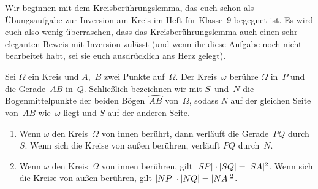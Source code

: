 Wir beginnen mit dem Kreisberührungslemma, das euch schon als Übungsaufgabe zur Inversion am Kreis im Heft für Klasse~9 begegnet ist. Es wird euch also wenig überraschen, dass das Kreisberührungslemma auch einen sehr eleganten Beweis mit Inversion zulässt (und wenn ihr diese Aufgabe noch nicht bearbeitet habt, sei sie euch ausdrücklich ans Herz gelegt).

\begin{satzmitnamen}[Kreisberührungslemma]
	Sei $\Omega$ ein Kreis und $A$,~$B$ zwei Punkte auf~$\Omega$. Der Kreis~$\omega$ berühre $\Omega$ in~$P$ und die Gerade~$AB$ in~$Q$. Schließlich bezeichnen wir mit $S$~und~$N$ die Bogenmittelpunkte der beiden Bögen~$\wideparen{AB}$ von~$\Omega$, sodass $N$ auf der gleichen Seite von~$AB$ wie~$\omega$ liegt und $S$ auf der anderen Seite.
	\begin{enumerate}
		\item \label{itm:Kreisberuhrung}
		Wenn $\omega$ den Kreis~$\Omega$ von innen berührt, dann verläuft die Gerade~$PQ$ durch~$S$. Wenn sich die Kreise von außen berühren, verläuft $PQ$ durch~$N$.
		\item \label{itm:KreisberuhrungProdukt}
		Wenn $\omega$ den Kreis~$\Omega$ von innen berühren, gilt $\lvert SP\rvert\cdot \lvert SQ\rvert=\lvert SA\rvert^2$. Wenn sich die Kreise von außen berühren, gilt $\lvert NP\rvert\cdot \lvert NQ\rvert=\lvert NA\rvert^2$.
	\end{enumerate}
\end{satzmitnamen}

